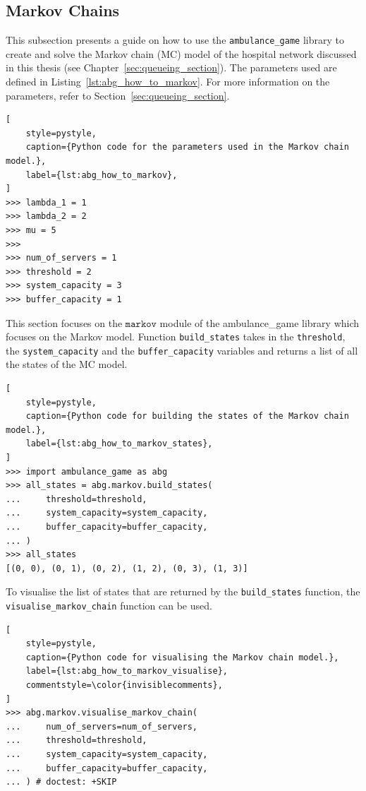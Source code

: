 \subsection{Markov Chains}

This subsection presents a guide on how to use the \texttt{ambulance\_game}
library to create and solve the Markov chain (MC) model of the hospital network
discussed in this thesis (see Chapter~\ref{sec:queueing_section}).
The parameters used are defined in Listing~\ref{lst:abg_how_to_markov}.
For more information on the parameters, refer to
Section~\ref{sec:queueing_section}.


\begin{lstlisting}[
    style=pystyle,
    caption={Python code for the parameters used in the Markov chain model.},
    label={lst:abg_how_to_markov},
]
>>> lambda_1 = 1
>>> lambda_2 = 2
>>> mu = 5
>>>
>>> num_of_servers = 1
>>> threshold = 2
>>> system_capacity = 3
>>> buffer_capacity = 1

\end{lstlisting}

This section focuses on the $\texttt{markov}$ module of the ambulance\_game
library which focuses on the Markov model.
Function \texttt{build\_states} takes in the \texttt{threshold}, the
\texttt{system\_capacity} and the \texttt{buffer\_capacity} variables and
returns a list of all the states of the MC model.

\begin{lstlisting}[
    style=pystyle,
    caption={Python code for building the states of the Markov chain model.},
    label={lst:abg_how_to_markov_states},
]
>>> import ambulance_game as abg
>>> all_states = abg.markov.build_states(
...     threshold=threshold,
...     system_capacity=system_capacity,
...     buffer_capacity=buffer_capacity,
... )
>>> all_states
[(0, 0), (0, 1), (0, 2), (1, 2), (0, 3), (1, 3)]

\end{lstlisting}

To visualise the list of states that are returned by the
\texttt{build\_states} function, the \texttt{visualise\_markov\_chain}
function can be used.

\begin{lstlisting}[
    style=pystyle,
    caption={Python code for visualising the Markov chain model.},
    label={lst:abg_how_to_markov_visualise},
    commentstyle=\color{invisiblecomments},
]
>>> abg.markov.visualise_markov_chain(
...     num_of_servers=num_of_servers,
...     threshold=threshold,
...     system_capacity=system_capacity,
...     buffer_capacity=buffer_capacity,
... ) # doctest: +SKIP
\end{lstlisting}

